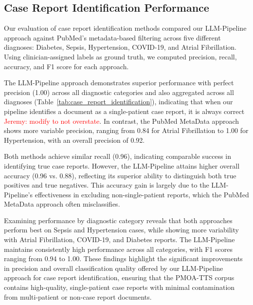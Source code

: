 \subsection{Case Report Identification Performance}
\label{sec:results_case_identification}



Our evaluation of case report identification methods compared our LLM-Pipeline approach against PubMed's metadata-based filtering across five different diagnoses: Diabetes, Sepsis, Hypertension, COVID-19, and Atrial Fibrillation. 
Using clinician-assigned labels as ground truth, we computed precision, recall, accuracy, and F1 score for each approach.

The LLM-Pipeline approach demonstrates superior performance with perfect precision (1.00) across all diagnostic categories and also aggregated across all diagnoses (Table~\ref{tab:case_report_identification}), indicating that when our pipeline identifies a document as a single-patient case report, it is always correct \textcolor{red}{Jeremy: modify to not overstate}. In contrast, the PubMed MetaData approach shows more variable precision, ranging from 0.84 for Atrial Fibrillation to 1.00 for Hypertension, with an overall precision of 0.92.

Both methods achieve similar recall (0.96), indicating comparable success in identifying true case reports.
However, the LLM-Pipeline attains higher overall accuracy (0.96 vs. 0.88), reflecting its superior ability to distinguish both true positives and true negatives. This accuracy gain is largely due to the LLM-Pipeline’s effectiveness in excluding non-single-patient reports, which the PubMed MetaData approach often misclassifies.

Examining performance by diagnostic category reveals that both approaches perform best on Sepsis and Hypertension cases, while showing more variability with Atrial Fibrillation, COVID-19, and Diabetes reports. The LLM-Pipeline maintains consistently high performance across all categories, with F1 scores ranging from 0.94 to 1.00. These findings highlight the significant improvements in precision and overall classification quality offered by our LLM-Pipeline approach for case report identification, ensuring that the PMOA-TTS corpus contains high-quality, single-patient case reports with minimal contamination from multi-patient or non-case report documents.



